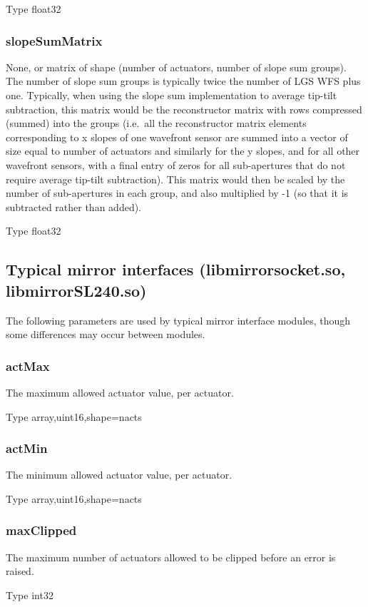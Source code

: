 \documentclass[a4,10pt]{article}
\begin{document}
Type float32

\subsubsection{slopeSumMatrix}
None, or matrix of shape (number of actuators, number of slope sum
groups).  The number of slope sum groups is typically twice the number
of LGS WFS plus one.  Typically, when using the slope sum
implementation to average tip-tilt subtraction, this matrix would be
the reconstructor matrix with rows compressed (summed) into the groups
(i.e.\ all the reconstructor matrix elements corresponding to x slopes
of one wavefront sensor are summed into a vector of size equal to
number of actuators and similarly for the y slopes, and for all other
wavefront sensors, with a final entry of zeros for all sub-apertures
that do not require average tip-tilt subtraction).  This matrix would
then be scaled by the number of sub-apertures in each group, and also
multiplied by -1 (so that it is subtracted rather than added).

Type float32

\subsection{Typical mirror interfaces (libmirrorsocket.so, libmirrorSL240.so)}
The following parameters are used by typical mirror interface modules,
though some differences may occur between modules.

\subsubsection{actMax}
The maximum allowed actuator value, per actuator.

Type array,uint16,shape=nacts

\subsubsection{actMin}
The minimum allowed actuator value, per actuator.

Type array,uint16,shape=nacts

\subsubsection{maxClipped}
The maximum number of actuators allowed to be clipped before an error
is raised.

Type int32
\end{document}
